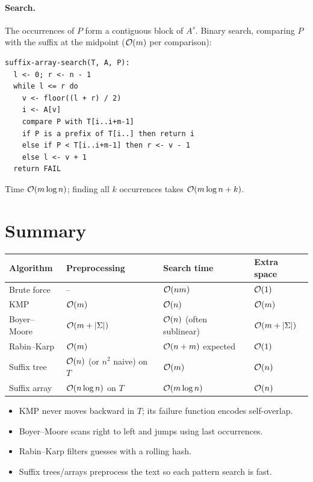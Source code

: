 \paragraph{Search.} The occurrences of $P$ form a contiguous block of $A^s$.
Binary search, comparing $P$ with the suffix at the midpoint ($\mathcal{O}(m)$ per
comparison):
\begin{lstlisting}
suffix-array-search(T, A, P):
  l <- 0; r <- n - 1
  while l <= r do
    v <- floor((l + r) / 2)
    i <- A[v]
    compare P with T[i..i+m-1]
    if P is a prefix of T[i..] then return i
    else if P < T[i..i+m-1] then r <- v - 1
    else l <- v + 1
  return FAIL
\end{lstlisting}
Time $\mathcal{O}(m \log n)$; finding all $k$ occurrences takes $\mathcal{O}(m\log n + k)$.

\section{Summary}

\begin{center}
\begin{tabular}{llll}
\toprule
Algorithm & Preprocessing & Search time & Extra space\\
\midrule
Brute force & -- & $\mathcal{O}(nm)$ & $\mathcal{O}(1)$\\
KMP & $\mathcal{O}(m)$ & $\mathcal{O}(n)$ & $\mathcal{O}(m)$\\
Boyer--Moore & $\mathcal{O}(m + |\Sigma|)$ & $\mathcal{O}(n)$ (often sublinear) & $\mathcal{O}(m + |\Sigma|)$\\
Rabin--Karp & $\mathcal{O}(m)$ & $\mathcal{O}(n + m)$ expected & $\mathcal{O}(1)$\\
Suffix tree & $\mathcal{O}(n)$ (or $n^2$ naive) on $T$ & $\mathcal{O}(m)$ & $\mathcal{O}(n)$\\
Suffix array & $\mathcal{O}(n\log n)$ on $T$ & $\mathcal{O}(m\log n)$ & $\mathcal{O}(n)$\\
\bottomrule
\end{tabular}
\end{center}
\begin{itemize}
  \item KMP never moves backward in $T$; its failure function encodes self-overlap.
  \item Boyer--Moore scans right to left and jumps using last occurrences.
  \item Rabin--Karp filters guesses with a rolling hash.
  \item Suffix trees/arrays preprocess the text so each pattern search is fast.
\end{itemize}

